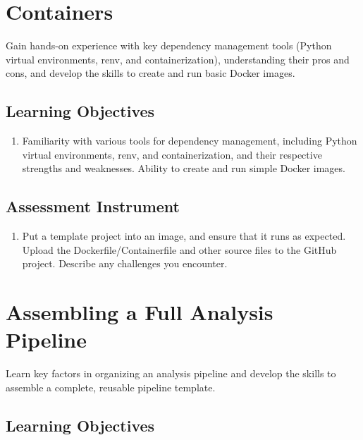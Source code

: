 \section{Containers}
\label{sec:5.5}

Gain hands-on experience with key dependency management tools (Python virtual environments, renv, and containerization), understanding their pros and cons, and develop the skills to create and run basic Docker images.

\subsection{Learning Objectives}

\begin{enumerate}
    \item Familiarity with various tools for dependency management, including Python virtual environments, renv, and containerization, and their respective strengths and weaknesses. Ability to create and run simple Docker images.
\end{enumerate}

\subsection{Assessment Instrument}

\begin{enumerate}
    \item Put a template project into an image, and ensure that it runs as expected. Upload the Dockerfile/Containerfile and other source files to the GitHub project. Describe any challenges you encounter.
\end{enumerate}

\section{Assembling a Full Analysis Pipeline}
\label{sec:5.6}

Learn key factors in organizing an analysis pipeline and develop the skills to assemble a complete, reusable pipeline template.

\subsection{Learning Objectives}

